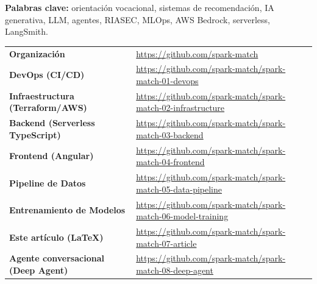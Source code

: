 \vspace{0.5cm}
\noindent\textbf{Palabras clave:} orientaci\'on vocacional, sistemas de recomendaci\'on, IA generativa, LLM, agentes, RIASEC, MLOps, AWS Bedrock, serverless, LangSmith.

\newpage

\begin{tcolorbox}[title=Repositorios y recursos del proyecto, breakable, colback=blue!2, colframe=blue!40!black]
\renewcommand{\arraystretch}{1.4}
\begin{tabularx}{\linewidth}{@{} >{\bfseries}l >{\raggedright\arraybackslash}X @{}}
    Organizaci\'on & \url{https://github.com/spark-match} \\
    DevOps (CI/CD) & \url{https://github.com/spark-match/spark-match-01-devops} \\
    Infraestructura (Terraform/AWS) & \url{https://github.com/spark-match/spark-match-02-infrastructure} \\
    Backend (Serverless TypeScript) & \url{https://github.com/spark-match/spark-match-03-backend} \\
    Frontend (Angular) & \url{https://github.com/spark-match/spark-match-04-frontend} \\
    Pipeline de Datos & \url{https://github.com/spark-match/spark-match-05-data-pipeline} \\
    Entrenamiento de Modelos & \url{https://github.com/spark-match/spark-match-06-model-training} \\
    Este art\'iculo (LaTeX) & \url{https://github.com/spark-match/spark-match-07-article} \\
    Agente conversacional (Deep Agent) & \url{https://github.com/spark-match/spark-match-08-deep-agent} \\
\end{tabularx}
\end{tcolorbox}












\newpage
\renewcommand{\refname}{Referencias bibliogr\'aficas}



\newpage
\addtocounter{section}{1}


